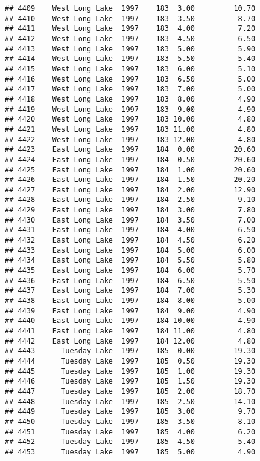 \documentclass[
]{article}
\begin{document}
\begin{verbatim}
## 4409    West Long Lake  1997    183  3.00         10.70
## 4410    West Long Lake  1997    183  3.50          8.70
## 4411    West Long Lake  1997    183  4.00          7.20
## 4412    West Long Lake  1997    183  4.50          6.50
## 4413    West Long Lake  1997    183  5.00          5.90
## 4414    West Long Lake  1997    183  5.50          5.40
## 4415    West Long Lake  1997    183  6.00          5.10
## 4416    West Long Lake  1997    183  6.50          5.00
## 4417    West Long Lake  1997    183  7.00          5.00
## 4418    West Long Lake  1997    183  8.00          4.90
## 4419    West Long Lake  1997    183  9.00          4.90
## 4420    West Long Lake  1997    183 10.00          4.80
## 4421    West Long Lake  1997    183 11.00          4.80
## 4422    West Long Lake  1997    183 12.00          4.80
## 4423    East Long Lake  1997    184  0.00         20.60
## 4424    East Long Lake  1997    184  0.50         20.60
## 4425    East Long Lake  1997    184  1.00         20.60
## 4426    East Long Lake  1997    184  1.50         20.20
## 4427    East Long Lake  1997    184  2.00         12.90
## 4428    East Long Lake  1997    184  2.50          9.10
## 4429    East Long Lake  1997    184  3.00          7.80
## 4430    East Long Lake  1997    184  3.50          7.00
## 4431    East Long Lake  1997    184  4.00          6.50
## 4432    East Long Lake  1997    184  4.50          6.20
## 4433    East Long Lake  1997    184  5.00          6.00
## 4434    East Long Lake  1997    184  5.50          5.80
## 4435    East Long Lake  1997    184  6.00          5.70
## 4436    East Long Lake  1997    184  6.50          5.50
## 4437    East Long Lake  1997    184  7.00          5.30
## 4438    East Long Lake  1997    184  8.00          5.00
## 4439    East Long Lake  1997    184  9.00          4.90
## 4440    East Long Lake  1997    184 10.00          4.90
## 4441    East Long Lake  1997    184 11.00          4.80
## 4442    East Long Lake  1997    184 12.00          4.80
## 4443      Tuesday Lake  1997    185  0.00         19.30
## 4444      Tuesday Lake  1997    185  0.50         19.30
## 4445      Tuesday Lake  1997    185  1.00         19.30
## 4446      Tuesday Lake  1997    185  1.50         19.30
## 4447      Tuesday Lake  1997    185  2.00         18.70
## 4448      Tuesday Lake  1997    185  2.50         14.10
## 4449      Tuesday Lake  1997    185  3.00          9.70
## 4450      Tuesday Lake  1997    185  3.50          8.10
## 4451      Tuesday Lake  1997    185  4.00          6.20
## 4452      Tuesday Lake  1997    185  4.50          5.40
## 4453      Tuesday Lake  1997    185  5.00          4.90

\end{verbatim}
\end{document}
